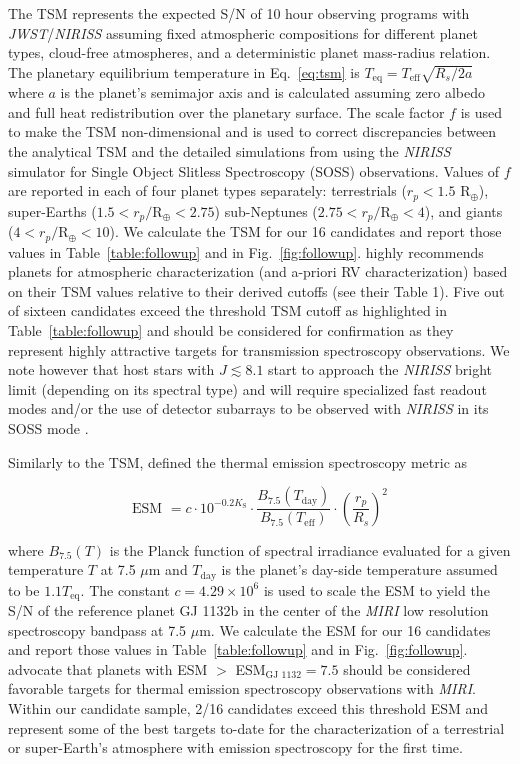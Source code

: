 \noindent The TSM represents the expected S/N of 10 hour observing programs with \emph{JWST}/\emph{NIRISS}
assuming fixed atmospheric compositions for different planet types, cloud-free atmospheres, and a
deterministic planet mass-radius relation. The planetary equilibrium temperature in Eq.~\ref{eq:tsm}
is $T_{\text{eq}} = T_{\text{eff}} \sqrt{R_s/2a}$ where $a$ is the planet's semimajor axis and is calculated
assuming zero albedo and full heat redistribution over the planetary surface. The scale factor $f$ is
used to make the TSM non-dimensional and is used to correct discrepancies between the analytical TSM
and the detailed simulations from \cite{louie18} using the \emph{NIRISS} simulator for Single Object
Slitless Spectroscopy (SOSS) observations. Values of $f$ are reported in \cite{kempton18} each of four
planet types separately: terrestrials ($r_p < 1.5$ R$_{\oplus}$), super-Earths ($1.5 < r_p/\text{R}_{\oplus} < 2.75$) 
sub-Neptunes ($2.75 < r_p/\text{R}_{\oplus} < 4$), and giants ($4 < r_p/\text{R}_{\oplus} < 10$). 
We calculate the TSM for our 16 candidates and report those values in Table~\ref{table:followup} and in
Fig.~\ref{fig:followup}. \cite{kempton18} highly recommends planets for atmospheric characterization
(and a-priori RV characterization) based on their TSM values relative to their derived cutoffs (see
their Table 1). Five out of sixteen candidates exceed the threshold TSM cutoff as highlighted in Table~\ref{table:followup}
and should be considered for confirmation as they represent highly attractive targets for transmission spectroscopy
observations. We note however that host stars with $J\lesssim 8.1$ start to approach the \emph{NIRISS}
bright limit (depending on its spectral type) and will require specialized fast readout modes and/or the use
of detector subarrays to be observed with \emph{NIRISS} in its SOSS mode \citep{beichman14}.

Similarly to the TSM, \cite{kempton18} defined the thermal emission spectroscopy metric as

\begin{equation}
  \text{ESM } = c \cdot 10^{-0.2K_{\text{S}}} \cdot \frac{B_{7.5}(T_{\text{day}})}{B_{7.5}(T_{\text{eff}})} \cdot
  \left( \frac{r_p}{R_s} \right)^2
\end{equation}

\noindent where $B_{7.5}(T)$ is the Planck function of spectral irradiance evaluated for a given temperature
$T$ at 7.5 $\mu$m and $T_{\text{day}}$ is the planet's day-side temperature assumed to be $1.1T_{\text{eq}}$.
The constant $c=4.29\times 10^6$ is used to scale the ESM to yield the S/N of the reference planet GJ 1132b
\citep{berta15,dittmann17b} in the center of the \emph{MIRI} low resolution spectroscopy bandpass at 7.5 $\mu$m. 
We calculate the ESM for our 16 candidates and report those values in Table~\ref{table:followup} and in
Fig.~\ref{fig:followup}. \citep{kempton18} advocate that planets with ESM $>$ ESM$_{\text{GJ 1132}}=7.5$ should
be considered favorable targets for thermal emission spectroscopy observations with \emph{MIRI}. Within our
candidate sample, 2/16 candidates exceed this threshold ESM and represent some of the best targets to-date for
the characterization of a terrestrial or super-Earth's atmosphere with emission spectroscopy for the first time.


